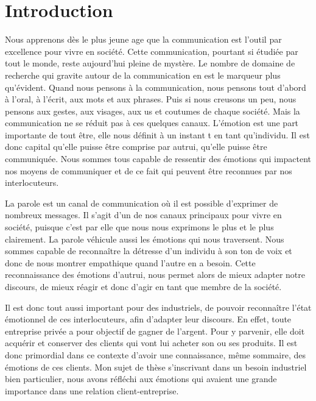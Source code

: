 \chapter*{Introduction}

Nous apprenons dès le plus jeune age que la communication est l'outil par excellence pour vivre en société. Cette communication, pourtant si étudiée par tout le monde, reste aujourd'hui pleine de mystère. Le nombre de domaine de recherche qui gravite autour de la communication en est le marqueur plus qu'évident. Quand nous pensons à la communication, nous pensons tout d'abord à l'oral, à l'écrit, aux mots et aux phrases. Puis si nous creusons un peu, nous pensons aux gestes, aux visages, aux us et coutumes de chaque société. Mais la communication ne se réduit pas à ces quelques canaux. L'émotion est une part importante de tout être, elle nous définit à un instant t en tant qu'individu. Il est donc capital qu'elle puisse être comprise par autrui, qu'elle puisse être communiquée. Nous sommes tous capable de ressentir des émotions qui impactent nos moyens de communiquer et de ce fait qui peuvent être reconnues par nos interlocuteurs.

La parole est un canal de communication où il est possible d'exprimer de nombreux messages. Il s'agit d'un de nos canaux principaux pour vivre en société, puisque c'est par elle que nous nous exprimons le plus et le plus clairement. La parole véhicule aussi les émotions qui nous traversent. Nous sommes capable de reconnaître la détresse d'un individu à son ton de voix et donc de nous montrer empathique quand l'autre en a besoin. Cette reconnaissance des émotions d'autrui, nous permet alors de mieux adapter notre discours, de mieux réagir et donc d'agir en tant que membre de la société.

Il est donc tout aussi important pour des industriels, de pouvoir reconnaître l'état émotionnel de ces interlocuteurs, afin d'adapter leur discours. En effet, toute entreprise privée a pour objectif de gagner de l'argent. Pour y parvenir, elle doit acquérir et conserver des clients qui vont lui acheter son ou ses produits. Il est donc primordial dans ce contexte d'avoir une connaissance, même sommaire, des émotions de ces clients. Mon sujet de thèse s'inscrivant dans un besoin industriel bien particulier, nous avons réfléchi aux émotions qui avaient une grande importance dans une relation client-entreprise.

